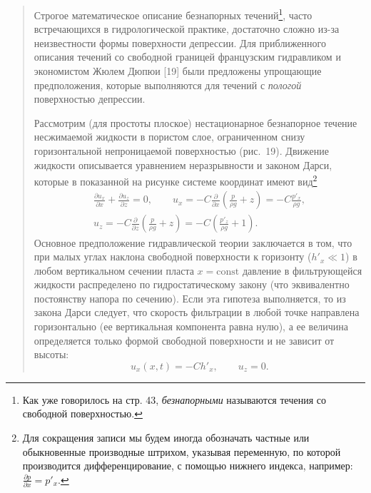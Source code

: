 \documentclass[12pt,a4paper]{article}
\begin{document}
\begin{quote}\sloppy
Строгое математическое описание безнапорных течений\footnote{Как уже говорилось на стр. 43, \textit{безнапорными} называются течения со свободной поверхностью.}, часто встречающихся в гидрологической практике, достаточно сложно из-за неизвестности формы поверхности депрессии. Для приближенного описания течений со свободной границей французским гидравликом и экономистом Жюлем Дюпюи [19] были предложены упрощающие предположения, которые выполняются для течений с \textit{пологой} поверхностью депрессии.


Рассмотрим (для простоты плоское) нестационарное безнапорное течение несжимаемой жидкости в пористом слое, ограниченном снизу горизонтальной непроницаемой поверхностью (рис.~19). Движение жидкости описывается уравнением неразрывности и законом Дарси, которые в показанной на рисунке системе координат имеют вид\footnote{Для сокращения записи мы будем иногда обозначать частные или обыкновенные производные штрихом, указывая переменную, по которой производится дифференцирование, с помощью нижнего индекса, например: $\frac{\partial p}{\partial x}=p'_x$.}
\begin{equation}\begin{gathered}
\frac{\partial u_x}{\partial x}+\frac{\partial u_z}{\partial z}=0,\qquad u_x=-C\frac{\partial}{\partial x}\left(\frac{p}{\rho g}+z\right)=-C\frac{p'_x}{\rho g},\\
u_z=-C\frac{\partial}{\partial z}\left(\frac{p}{\rho g}+z\right)=-C\left(\frac{p'_z}{\rho g}+1\right).
\end{gathered}\tag{9.1}\label{q6:eq-9-1}\end{equation}
Основное предположение гидравлической теории заключается в том, что при малых углах наклона свободной поверхности к горизонту ($h'_x\ll1$) в любом вертикальном сечении пласта $x=\mathrm{const}$ давление в фильтрующейся жидкости распределено по гидростатическому закону (что эквивалентно постоянству напора по сечению). Если эта гипотеза выполняется, то из закона Дарси следует,
что скорость фильтрации в любой точке направлена горизонтально (ее вертикальная компонента равна нулю), а ее величина определяется только формой свободной поверхности и не зависит от высоты:
\[u_x(x,t)=-Ch'_x,\qquad u_z=0.\]
\par\nobreak{}\par
\end{quote}
\end{document}
